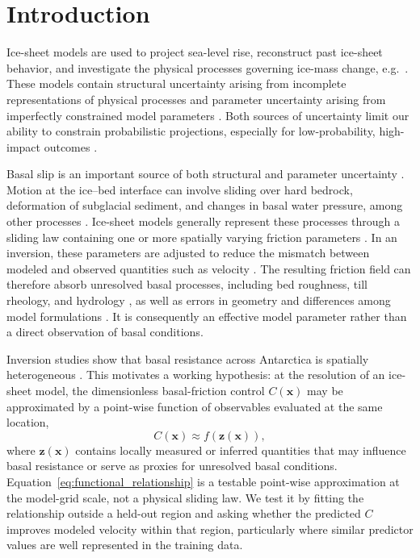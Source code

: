\documentclass[review,jog]{igs}
\begin{document}
\section{Introduction}

Ice-sheet models are used to project sea-level rise, reconstruct past ice-sheet behavior, and investigate the physical processes governing ice-mass change, e.g.\ \citet{lecavalier2025history,nowicki2016ice}. These models contain structural uncertainty arising from incomplete representations of physical processes and parameter uncertainty arising from imperfectly constrained model parameters \citep{hebeler2008impact,recinos2023framework}. Both sources of uncertainty limit our ability to constrain probabilistic projections, especially for low-probability, high-impact outcomes \citep{kopp2017evolving}.

Basal slip is an important source of both structural and parameter uncertainty \citep{joughin2019regularized, bulthuis2019uncertainty}. Motion at the ice--bed interface can involve sliding over hard bedrock, deformation of subglacial sediment, and changes in basal water pressure, among other processes \citep{schoof2013ice,noble2020sensitivity}. Ice-sheet models generally represent these processes through a sliding law containing one or more spatially varying friction parameters \citep{weertman1964theory,schoof2005cavitation}. In an inversion, these parameters are adjusted to reduce the mismatch between modeled and observed quantities such as velocity \citep{macayeal1993tutorial}. The resulting friction field can therefore absorb unresolved basal processes, including bed roughness, till rheology, and hydrology \citep{tulaczyk2000basal,lu2023coupling}, as well as errors in geometry and differences among model formulations \citep{barnes2021transferability}. It is consequently an effective model parameter rather than a direct observation of basal conditions.

Inversion studies show that basal resistance across Antarctica is spatially heterogeneous \citep{morlighem2013inversion,zhao2018basal}. This motivates a working hypothesis: at the resolution of an ice-sheet model, the dimensionless basal-friction control $C(\mathbf{x})$ may be approximated by a point-wise function of observables evaluated at the same location,
\begin{equation}
\label{eq:functional_relationship}
C(\mathbf{x}) \approx f\!\left(\mathbf{z}(\mathbf{x})\right),
\end{equation}
where $\mathbf{z}(\mathbf{x})$ contains locally measured or inferred quantities that may influence basal resistance or serve as proxies for unresolved basal conditions. Equation~\ref{eq:functional_relationship} is a testable point-wise approximation at the model-grid scale, not a physical sliding law. We test it by fitting the relationship outside a held-out region and asking whether the predicted $C$ improves modeled velocity within that region, particularly where similar predictor values are well represented in the training data.
\end{document}
